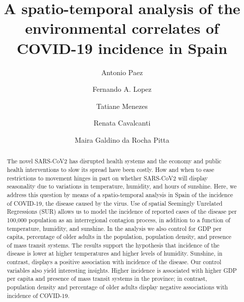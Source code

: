 \documentclass[]{elsarticle} %
\begin{document}
\begin{frontmatter}

  \title{A spatio-temporal analysis of the environmental correlates of COVID-19
incidence in Spain}
    \author[McMaster University]{Antonio Paez}
    \author[Universidad Politecnica de Cartagena]{Fernando A. Lopez}
    \author[Departamento de Economia]{Tatiane Menezes}
    \author[Nucleo de Pesquisa]{Renata Cavalcanti}
    \author[Nucleo de Pesquisa]{Maira Galdino da Rocha Pitta}
      \address[McMaster University]{School of Geography and Earth Sciences, McMaster University, 1281 Main
St W, Hamilton, ON, L8S 4K1, Canada}
    \address[Universidad Politecnica de Cartagena]{Departamento de Metodos Cuantitativos, Ciencias Juridicas, y Lenguas
Modernas, Universidad Politecnica de Cartagena, Calle Real Numero 3,
30201, Cartagena, Murcia, Spain}
    \address[Departamento de Economia]{Departamento de Economia, Universidade Federal de Pernambuco, Av dos
Economistas, s/n - Cidade Universitária, Recife - PE, 50670-901, Brasil}
    \address[Nucleo de Pesquisa]{Núcleo de Pesquisa em Inovação Terapêutica NUPIT / UFPE, Av.
Prof.~Moraes Rego, 1235 - Cidade Universitária, Recife, PE, CEP
50670-901, Brazil}
  
  \begin{abstract}
  The novel SARS-CoV2 has disrupted health systems and the economy and
  public health interventions to slow its spread have been costly. How and
  when to ease restrictions to movement hinges in part on whether
  SARS-CoV2 will display seasonality due to variations in temperature,
  humidity, and hours of sunshine. Here, we address this question by means
  of a spatio-temporal analysis in Spain of the incidence of COVID-19, the
  disease caused by the virus. Use of spatial Seemingly Unrelated
  Regressions (SUR) allows us to model the incidence of reported cases of
  the disease per 100,000 population as an interregional contagion
  process, in addition to a function of temperature, humidity, and
  sunshine. In the analysis we also control for GDP per capita, percentage
  of older adults in the population, population density, and presence of
  mass transit systems. The results support the hypothesis that incidence
  of the disease is lower at higher temperatures and higher levels of
  humidity. Sunshine, in contrast, displays a positive association with
  incidence of the disease. Our control variables also yield interesting
  insights. Higher incidence is associated with higher GDP per capita and
  presence of mass transit systems in the province; in contrast,
  population density and percentage of older adults display negative
  associations with incidence of COVID-19.
  \end{abstract}
  
 \end{frontmatter}
\end{document}

